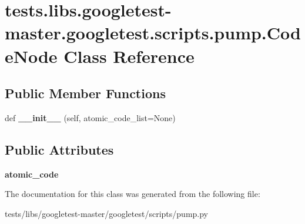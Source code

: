 \hypertarget{classtests_1_1libs_1_1googletest-master_1_1googletest_1_1scripts_1_1pump_1_1CodeNode}{}\section{tests.\+libs.\+googletest-\/master.googletest.\+scripts.\+pump.\+Code\+Node Class Reference}
\label{classtests_1_1libs_1_1googletest-master_1_1googletest_1_1scripts_1_1pump_1_1CodeNode}
\subsection*{Public Member Functions}
\begin{DoxyCompactItemize}
\item 
\mbox{\label{classtests_1_1libs_1_1googletest-master_1_1googletest_1_1scripts_1_1pump_1_1CodeNode_acfb53c8a73d01ef230dd3d2559c040e0}} 
def {\bfseries \+\_\+\+\_\+init\+\_\+\+\_\+} (self, atomic\+\_\+code\+\_\+list=None)
\end{DoxyCompactItemize}
\subsection*{Public Attributes}
\begin{DoxyCompactItemize}
\item 
\mbox{\label{classtests_1_1libs_1_1googletest-master_1_1googletest_1_1scripts_1_1pump_1_1CodeNode_a0837867028e40c5b1c67e70788271a99}} 
{\bfseries atomic\+\_\+code}
\end{DoxyCompactItemize}


The documentation for this class was generated from the following file\+:\begin{DoxyCompactItemize}
\item 
tests/libs/googletest-\/master/googletest/scripts/pump.\+py\end{DoxyCompactItemize}
